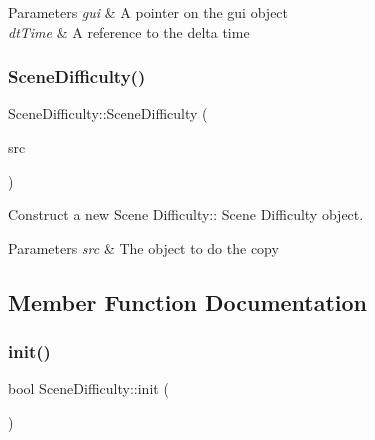 \begin{DoxyParams}{Parameters}
{\em gui} & A pointer on the gui object \\
\hline
{\em dt\+Time} & A reference to the delta time \\
\hline
\end{DoxyParams}
\mbox{\label{class_scene_difficulty_acdc2735a42657e7c6f2b905d59f3d743}} 
\subsubsection{\texorpdfstring{Scene\+Difficulty()}{SceneDifficulty()}\hspace{0.1cm}{\footnotesize\ttfamily [2/2]}}
{\footnotesize\ttfamily Scene\+Difficulty\+::\+Scene\+Difficulty (\begin{DoxyParamCaption}\item[{\hyperlink{class_scene_difficulty}{Scene\+Difficulty} const \&}]{src }\end{DoxyParamCaption})}



Construct a new Scene Difficulty\+:\+: Scene Difficulty object. 


\begin{DoxyParams}{Parameters}
{\em src} & The object to do the copy \\
\hline
\end{DoxyParams}


\subsection{Member Function Documentation}
\mbox{\label{class_scene_difficulty_a7fb9dd5ee9d623e346d917cd7a5db956}} 
\subsubsection{\texorpdfstring{init()}{init()}}
{\footnotesize\ttfamily bool Scene\+Difficulty\+::init (\begin{DoxyParamCaption}{ }\end{DoxyParamCaption})\hspace{0.3cm}{\ttfamily [virtual]}}



